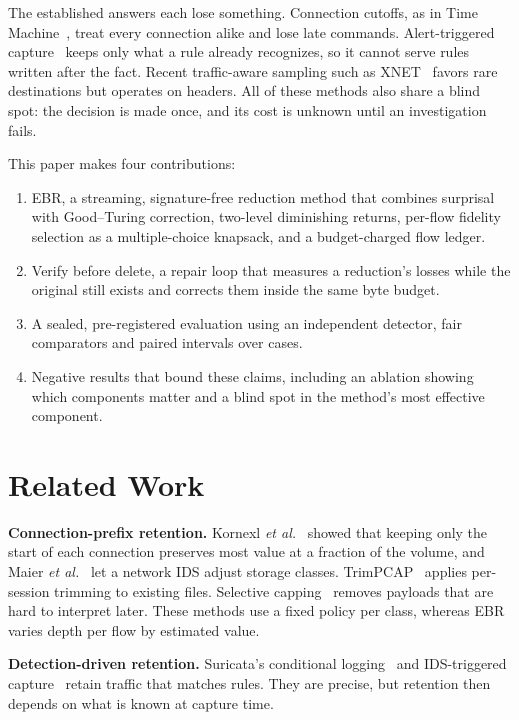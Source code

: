 \documentclass[conference]{IEEEtran}
\begin{document}
The established answers each lose something. Connection cutoffs, as in Time Machine~\cite{timemachine,timetravel}, treat every connection alike and lose late commands. Alert-triggered capture~\cite{sanspcap,suricata} keeps only what a rule already recognizes, so it cannot serve rules written after the fact. Recent traffic-aware sampling such as XNET~\cite{xnet} favors rare destinations but operates on headers. All of these methods also share a blind spot: the decision is made once, and its cost is unknown until an investigation fails.

This paper makes four contributions:
\begin{enumerate}
\item EBR, a streaming, signature-free reduction method that combines surprisal with Good--Turing correction, two-level diminishing returns, per-flow fidelity selection as a multiple-choice knapsack, and a budget-charged flow ledger.
\item Verify before delete, a repair loop that measures a reduction's losses while the original still exists and corrects them inside the same byte budget.
\item A sealed, pre-registered evaluation using an independent detector, fair comparators and paired intervals over cases.
\item Negative results that bound these claims, including an ablation showing which components matter and a blind spot in the method's most effective component.
\end{enumerate}

\section{Related Work}
\textbf{Connection-prefix retention.} Kornexl \emph{et al.}~\cite{timemachine} showed that keeping only the start of each connection preserves most value at a fraction of the volume, and Maier \emph{et al.}~\cite{timetravel} let a network IDS adjust storage classes. TrimPCAP~\cite{trimpcap} applies per-session trimming to existing files. Selective capping~\cite{capping} removes payloads that are hard to interpret later. These methods use a fixed policy per class, whereas EBR varies depth per flow by estimated value.

\textbf{Detection-driven retention.} Suricata's conditional logging~\cite{suricata} and IDS-triggered capture~\cite{sanspcap} retain traffic that matches rules. They are precise, but retention then depends on what is known at capture time.
\end{document}
